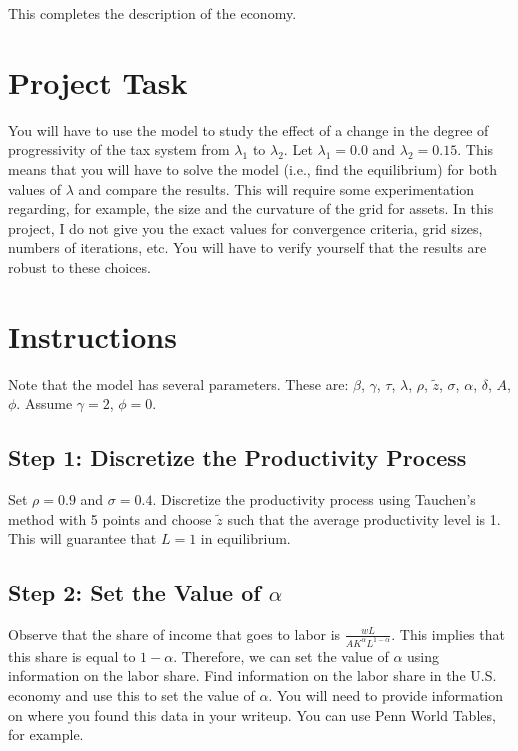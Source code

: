 \documentclass{article}
\begin{document}
This completes the description of the economy.

\section*{Project Task}
You will have to use the model to study the effect of a change in the degree of progressivity of the tax system from \(\lambda_{1}\) to \(\lambda_{2}\). Let \(\lambda_{1} = 0.0\) and \(\lambda_{2} = 0.15\). This means that you will have to solve the model (i.e., find the equilibrium) for both values of \(\lambda\) and compare the results. This will require some experimentation regarding, for example, the size and the curvature of the grid for assets. In this project, I do not give you the exact values for convergence criteria, grid sizes, numbers of iterations, etc. You will have to verify yourself that the results are robust to these choices.

\section*{Instructions}
Note that the model has several parameters. These are: \(\beta\), \(\gamma\), \(\tau\), \(\lambda\), \(\rho\), \(\tilde{z}\), \(\sigma\), \(\alpha\), \(\delta\), \(A\), \(\phi\). Assume \(\gamma = 2\), \(\phi = 0\).

\subsection*{Step 1: Discretize the Productivity Process}
Set \(\rho = 0.9\) and \(\sigma = 0.4\). Discretize the productivity process using Tauchen's method with 5 points and choose \(\tilde{z}\) such that the average productivity level is 1. This will guarantee that \(L = 1\) in equilibrium.

\subsection*{Step 2: Set the Value of \(\alpha\)}
Observe that the share of income that goes to labor is \(\frac{wL}{A K^{\alpha} L^{1 - \alpha}}\). This implies that this share is equal to \(1 - \alpha\). Therefore, we can set the value of \(\alpha\) using information on the labor share. Find information on the labor share in the U.S. economy and use this to set the value of \(\alpha\). You will need to provide information on where you found this data in your writeup. You can use Penn World Tables, for example.
\end{document}
